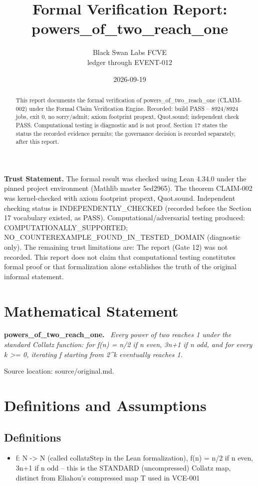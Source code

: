 \documentclass[11pt]{article}
\title{Formal Verification Report: powers\_of\_two\_reach\_one}
\author{Black Swan Labs FCVE \\ ledger through EVENT-012}
\date{2026-09-19}
\newenvironment{sourceresult}[1]{\par\medskip\noindent\textbf{#1.}\ \itshape}{\par\medskip}
\begin{document}
\maketitle

\noindent\textbf{Trust Statement.} The formal result was checked using Lean 4.34.0 under the pinned project environment (Mathlib master 5ed2965). The theorem CLAIM-002 was kernel-checked with axiom footprint propext, Quot.sound. Independent checking status is INDEPENDENTLY\_CHECKED (recorded before the Section 17 vocabulary existed, as PASS). Computational/adversarial testing produced: COMPUTATIONALLY\_SUPPORTED; NO\_COUNTEREXAMPLE\_FOUND\_IN\_TESTED\_DOMAIN (diagnostic only). The remaining trust limitations are: The report (Gate 12) was not recorded. This report does not claim that computational testing constitutes formal proof or that formalization alone establishes the truth of the original informal statement.

\begin{abstract}
This report documents the formal verification of powers\_of\_two\_reach\_one (CLAIM-002) under the Formal Claim Verification Engine. Recorded: build PASS -- 8924/8924 jobs, exit 0, no sorry/admit; axiom footprint propext, Quot.sound; independent check PASS. Computational testing is diagnostic and is not proof. Section 17 states the status the recorded evidence permits; the governance decision is recorded separately, after this report.
\end{abstract}

\section{Mathematical Statement}
\begin{sourceresult}{powers\_of\_two\_reach\_one}
Every power of two reaches 1 under the standard Collatz function: for f(n) = n/2 if n even, 3n+1 if n odd, and for every k >= 0, iterating f starting from 2\textasciicircum{}k eventually reaches 1.
\end{sourceresult}
Source location: source/original.md.

\section{Definitions and Assumptions}
\subsection*{Definitions}
\begin{itemize}
\item f: N -> N (called collatzStep in the Lean formalization), f(n) = n/2 if n even, 3n+1 if n odd -- this is the STANDARD (uncompressed) Collatz map, distinct from Eliahou's compressed map T used in VCE-001
\end{itemize}
\end{document}
